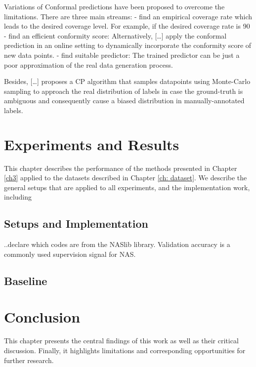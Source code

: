 \documentclass[a4paper,oneside,bibliography=totoc]{scrbook}
\begin{document}
Variations of Conformal predictions have been proposed to overcome the limitations. There are three main streams:
- find an empirical coverage rate which leads to the desired coverage level. For example, if the desired coverage rate is 90%
- find an efficient conformity score: Alternatively, […] apply the conformal prediction in an online setting to dynamically incorporate the conformity score of new data points.
- find suitable predictor: The trained predictor can be just a poor approximation of the real data generation process.

Besides, […] proposes a CP algorithm that samples datapoints using Monte-Carlo sampling to approach the real distribution of labels in case the ground-truth is ambiguous and consequently cause a biased distribution in manually-annotated labels.







\chapter{Experiments and Results}
This chapter describes the performance of the methods presented in Chapter \ref{ch3}  applied to the datasets described in Chapter \ref{ch: dataset}. We describe the general setups that are applied to all experiments,  and the implementation work, including 


\section{Setups and Implementation}



..declare which codes are from the NASlib library.
Validation accuracy is a commonly used supervision signal for NAS.
\section{Baseline}


\chapter{Conclusion}
\label{Conclude}
This chapter presents the central findings of this work as well as their critical discussion. Finally, it highlights limitations and corresponding opportunities for further research.
\end{document}
